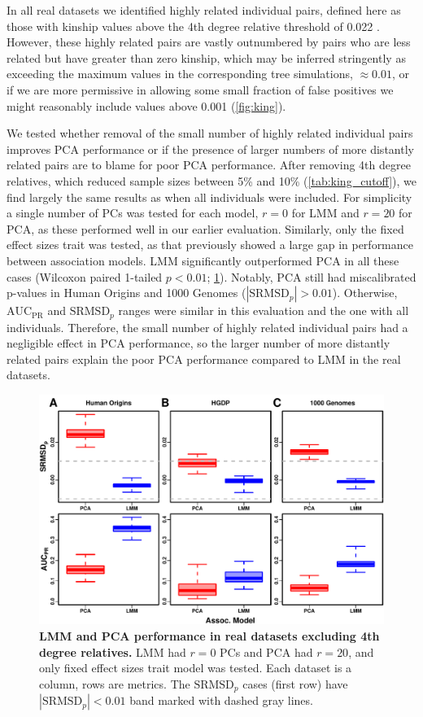 \documentclass[11pt]{article}
\newcommand{\rmsd}{\text{SRMSD}_p}
\newcommand{\auc}{\text{AUC}_\text{PR}}
\begin{document}
In all real datasets we identified highly related individual pairs, defined here as those with kinship values above the 4th degree relative threshold of 0.022 \citep{manichaikul_robust_2010, conomos_model-free_2016}.
However, these highly related pairs are vastly outnumbered by pairs who are less related but have greater than zero kinship, which may be inferred stringently as exceeding the maximum values in the corresponding tree simulations, $\approx 0.01$, or if we are more permissive in allowing some small fraction of false positives we might reasonably include values above 0.001 (\cref{fig:king}).

We tested whether removal of the small number of highly related individual pairs improves PCA performance or if the presence of larger numbers of more distantly related pairs are to blame for poor PCA performance.
After removing 4th degree relatives, which reduced sample sizes between 5\% and 10\% (\cref{tab:king_cutoff}), we find largely the same results as when all individuals were included.
For simplicity a single number of PCs was tested for each model, $r=0$ for LMM and $r=20$ for PCA, as these performed well in our earlier evaluation.
Similarly, only the fixed effect sizes trait was tested, as that previously showed a large gap in performance between association models.
LMM significantly outperformed PCA in all these cases (Wilcoxon paired 1-tailed $p < 0.01$; \cref{fig:king_cutoff}).
Notably, PCA still had miscalibrated p-values in Human Origins and 1000 Genomes ($|\rmsd| > 0.01$).
Otherwise, $\auc$ and $\rmsd$ ranges were similar in this evaluation and the one with all individuals.
Therefore, the small number of highly related individual pairs had a negligible effect in PCA performance, so the larger number of more distantly related pairs explain the poor PCA performance compared to LMM in the real datasets.

\begin{figure}[bp!]
  \centering
  \includegraphics[width=\textwidth]{fes/rmsd-auc_king-cutoff-4.pdf}
  \caption{
    {\bf LMM and PCA performance in real datasets excluding 4th degree relatives.}
    LMM had $r=0$ PCs and PCA had $r=20$, and only fixed effect sizes trait model was tested.
    Each dataset is a column, rows are metrics.
    The $\rmsd$ cases (first row) have $|\rmsd| < 0.01$ band marked with dashed gray lines.
  }
  \label{fig:king_cutoff}
\end{figure}
\end{document}
